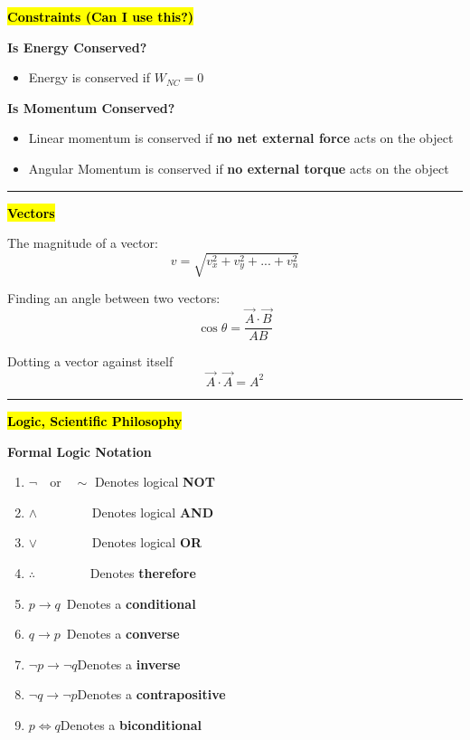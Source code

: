 \documentclass[	DIV=calc,%
							paper=a4,%
							fontsize=11pt,%
							twocolumn]{scrartcl} %
\date{\today} %
\newcommand{\hformbar}[1]{\vspace{5pt}\hrule\vspace{10pt}} %
\newcommand{\formdesc}[1]{\noindent\textbf{#1}}
\begin{document}
\thispagestyle{fancy} 	%
\hspace{10pt}

\formdesc{\hl{Constraints (Can I use this?)}}

\textbf{Is Energy Conserved?}
\begin{itemize}
    \item Energy is conserved if \textbf{$W_{NC}=0$}
\end{itemize}

\textbf{Is Momentum Conserved?}
\begin{itemize}
    \item Linear momentum is conserved if \textbf{no net external force} acts on the object
    \item Angular Momentum is conserved if \textbf{no external torque }acts on the object
\end{itemize}
\hformbar{}

\formdesc{\hl{Vectors}}

The magnitude of a vector:
\begin{equation}
    v = \sqrt{v_x^2 + v_y^2 + ... + v_n^2}
\end{equation}

Finding an angle between two vectors:
\begin{equation}
    \cos\theta = \frac{\vec A \cdot \vec B}{AB}
\end{equation}

Dotting a vector against itself
\begin{equation}
    \vec A\cdot\vec A = A^2
\end{equation}
\hformbar{}

\formdesc{\hl{Logic, Scientific Philosophy}}

\textbf{Formal Logic Notation}
\begin{enumerate}
    \item $\neg\quad\text{or}\quad\sim$
        Denotes logical \textbf{NOT}
    \item $\land\qquad\qquad$
        Denotes logical \textbf{AND}
    \item $\lor\qquad\qquad$
        Denotes logical \textbf{OR}
    \item $\therefore\qquad\qquad$
        Denotes \textbf{therefore}
    \item $p\rightarrow q$\qquad \  Denotes a \textbf{conditional}
    \item $q\rightarrow p$\qquad \ Denotes a \textbf{converse}
    \item $\neg p\rightarrow\neg q$\quad Denotes a \textbf{inverse}
    \item $\neg q\rightarrow\neg p$\quad Denotes a \textbf{contrapositive}
    \item $p\iff q$\quad Denotes a \textbf{biconditional}
\end{enumerate}
\end{document}
